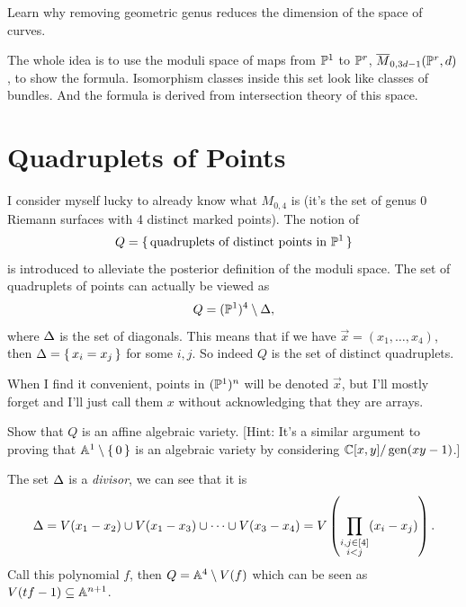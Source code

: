 \documentclass[12pt]{memoir}
\begin{document}
\begin{Ej}
Learn why removing geometric genus reduces the dimension of the space of curves.
\end{Ej}

\begin{ptcb}
\end{ptcb}

The whole idea is to use the moduli space of maps from $\mathbb{P}^1$ to $\mathbb{P}^r$, $\overline M_{0,3d-1}(\mathbb{P}^r,d)$, to show the formula. Isomorphism classes inside this set look like classes of bundles. And the formula is derived from intersection theory of this space. 

\section{Quadruplets of Points}

I consider myself lucky to already know what $M_{0,4}$ is (it's the set of genus 0 Riemann surfaces with 4 distinct marked points). The notion of 
$$Q=\{\,\text{quadruplets of distinct points in }\mathbb{P}^1\,\}$$
is introduced to alleviate the posterior definition of the moduli space. The set of quadruplets of points can actually be viewed as 
$$Q=(\mathbb{P}^1)^4\setminus\Delta,$$
where $\Delta$ is the set of diagonals. This means that if we have $\vec x=(x_1,\dots,x_4)$, then $\Delta=\{\,x_i=x_j\,\}$ for some $i,j$. So indeed $Q$ is the set of distinct quadruplets. 

\begin{Rmk}
    When I find it convenient, points in $(\mathbb{P}^1)^n$ will be denoted $\vec x$, but I'll mostly forget and I'll just call them $x$ without acknowledging that they are arrays.
\end{Rmk}

\begin{Ej}
Show that $Q$ is an affine algebraic variety. [Hint: It's a similar argument to proving that $\mathbb{A}^1\setminus\{\,0\,\}$ is an algebraic variety by considering $\mathbb{C}[x,y]/\operatorname{gen}(xy-1)$.]
\end{Ej}

\begin{ptcb}
    The set $\Delta$ is a \emph{divisor}, we can see that it is 
    $$\Delta=V(x_1-x_2)\cup V(x_1-x_3)\cup\cdots\cup V(x_3-x_4)=V\left(\prod_{\substack{i,j\in\left\lbrack4\right\rbrack\\ i<j}}(x_i-x_j)\right).$$
    Call this polynomial $f$, then $Q=\mathbb{A}^4\setminus V(f)$ which can be seen as $V(tf-1)\subseteq \mathbb{A}^{n+1}$.
    \end{ptcb}
\end{document}
